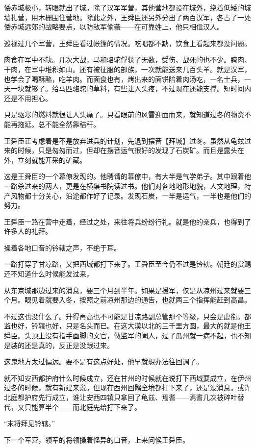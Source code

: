 倭赤城极小，转眼就出了城。除了汉军军营，其他营地都设在城外，绕着低矮的城墙扎营，用木栅围住营地。除此之外，王舜臣还另外分出了两百汉军，各占了一处倭赤城远郊的战略要点，以防敌军偷袭——在可靠姓上，他只相信汉人。

巡视过几个军营，王舜臣看过帐篷的情况。吃喝都不缺，饮食上看起来都没问题。

肉食在军中不缺。几次大战，马和骆驼俘获了无数，受伤、战死的也不少。腌肉、干肉，在军中堆积如山。还有被征服的部族，一次就能送来几百头羊。就是汉军，也学会了喝酥酪，吃羊肉。而面食也有，烤出来的面饼陪着肉汤吃，一名士兵，一天一块就够了。给马匹骆驼的草料，有些让人头疼，不过现在还能支撑。短时间内还是不用担心。

只是驱寒的燃料就很让人头痛了。只看眼前的风雪迎面而来，就知道过冬的物资不能再拖延。总不能全然靠秸秆。

王舜臣正考虑着是不是放弃进兵的计划，先退到摆音【拜城】过冬。虽然从龟兹过来的时候，只是匆匆而过，但却在摆音运气很好的发现了石炭矿。而且是露头在外，立刻就能开采的矿藏。

这是王舜臣的一个幕僚发现的。他聘请的幕僚中，有大半是气学弟子。其中跟着他一路杀过来的两人，更是在横渠书院读过书。他们对各地地形地貌，人文地理，特产风物都十分关心，沿途都作好了记录。发现石炭，一半是运气，一半也是他们的努力。

王舜臣一路在营中走着，经过之处，来往将兵纷纷行礼。就是他的亲兵，也得到了许多人的礼拜。

操着各地口音的钤辖之声，不绝于耳。

一路打穿了甘凉路，又把西域都打下来了。王舜臣至今仍不过是钤辖。朝廷的赏赐还不知道什么时候能发过来，

从东京城那边过来的消息，要三个月到半年。如果是援军，仅是从凉州过来就要三个月。眼见着就要入冬，按照之前凉州那边的通告，也就两三个指挥能赶到高昌。

不过这也没什么了。升得再高也不可能是甘凉路副总管那个等级，只会是虚衔。都监也好，钤辖也好，只是名头而已。在这大漠以北的三千里方圆，最大的就是他王舜臣。头顶上没有指手画脚的文官，做监军的阉人，过了瓜州就一病不起，也不知是装的还是真的，反正是没跟过来。

这鬼地方太过偏远。要不是有这点好处，他早就想办法往回调了。

就不知安西都护府什么时候成立，还在甘州的时候就在说打下西域要成立，在伊州过冬的时候，就有新建来说。但现在西州回鹘全境都打下来了，还是没消息。或许北庭都护府先行成立，谁让安西四镇只拿回了龟兹、焉耆——焉耆几次被碎叶替代，又只能算半个——而北庭先给打下来了。

“末将拜见钤辖。”

下一个军营，领军的将领操着怪异的口音，上来问候王舜臣。

